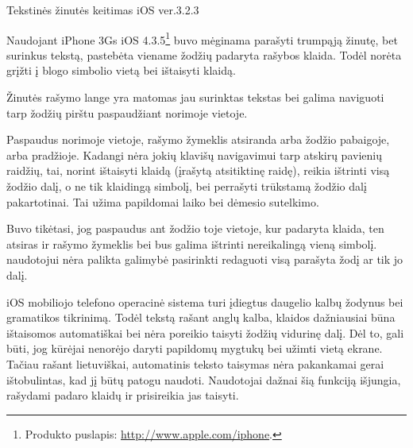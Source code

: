 \begin{xcase}{Tekstinės žinutės keitimas iOS ver.3.2.3}
  \xcgoal
  {
  	Naudojant iPhone 3Gs 
	iOS 4.3.5\footnote{Produkto puslapis: \url{http://www.apple.com/iphone}.}
	buvo mėginama parašyti trumpąją žinutę, bet surinkus tekstą, pastebėta 
	viename žodžių padaryta rašybos klaida. Todėl norėta grįžti į blogo 
	simbolio vietą bei ištaisyti klaidą.
	
  }
  
  \xctools
  {
    Žinutės rašymo lange yra matomas jau surinktas tekstas bei galima 
    naviguoti tarp žodžių pirštu paspaudžiant norimoje vietoje. 
  }
  
  \xcresult
  {
    Paspaudus norimoje vietoje, rašymo žymeklis atsiranda arba žodžio
    pabaigoje, arba pradžioje. Kadangi nėra jokių klavišų navigavimui tarp
    atskirų pavienių raidžių, tai, norint ištaisyti klaidą 
    (įrašytą atsitiktinę raidę), reikia ištrinti visą žodžio dalį, o ne tik 
    klaidingą simbolį, bei perrašyti trūkstamą žodžio dalį pakartotinai. Tai 
    užima papildomai laiko bei dėmesio sutelkimo.
  }
  
  \xcprinciples
  {
    {
      Buvo tikėtasi, jog paspaudus ant žodžio toje vietoje, kur padaryta klaida,
      ten atsiras ir rašymo žymeklis bei bus galima ištrinti nereikalingą vieną
      simbolį.
    }
    {
      naudotojui nėra palikta galimybė pasirinkti redaguoti visą
      parašyta žodį ar tik jo dalį.
    }
  }
  
  \xcthoughts
  {
    iOS mobiliojo telefono operacinė sistema turi įdiegtus daugelio
    kalbų žodynus bei gramatikos tikrinimą. Todėl tekstą rašant
    anglų kalba, klaidos dažniausiai būna ištaisomos automatiškai
    bei nėra poreikio taisyti žodžių vidurinę dalį. Dėl to, gali
    būti, jog kūrėjai nenorėjo daryti papildomų mygtukų bei
    užimti vietą ekrane. Tačiau rašant lietuviškai, automatinis
    teksto taisymas nėra pakankamai gerai ištobulintas, kad jį
    būtų patogu naudoti. Naudotojai dažnai šią funkciją išjungia,
    rašydami padaro klaidų ir prisireikia jas taisyti.
  }
\end{xcase}
